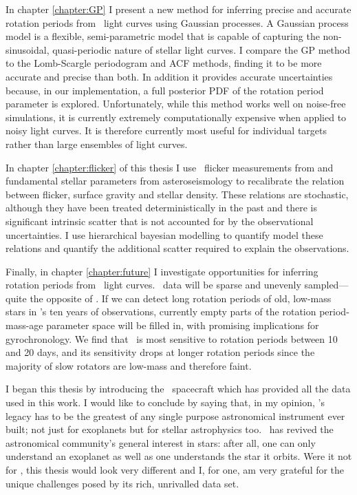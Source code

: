 In chapter \ref{chapter:GP} I present a new method for inferring precise and
accurate rotation periods from \kepler\ light curves using Gaussian processes.
A Gaussian process model is a flexible, semi-parametric model that is capable
of capturing the non-sinusoidal, quasi-periodic nature of stellar light
curves.
I compare the GP method to the Lomb-Scargle periodogram and ACF methods,
finding it to be more accurate and precise than both.
In addition it provides accurate uncertainties because, in our implementation,
a full posterior PDF of the rotation period parameter is explored.
Unfortunately, while this method works well on noise-free simulations, it is
currently extremely computationally expensive when applied to noisy light
curves.
It is therefore currently most useful for individual targets rather than large
ensembles of light curves.

In chapter \ref{chapter:flicker} of this thesis I use \kepler\ flicker
measurements from \citet{Bastien2013} and fundamental stellar parameters from
asteroseismology to recalibrate the relation between flicker, surface gravity
and stellar density.
These relations are stochastic, although they have been treated
deterministically in the past \citep[\eg][]{Bastien2013, Kipping2014} and
there is significant intrinsic scatter that is not accounted for by the
observational uncertainties.
I use hierarchical bayesian modelling to quantify  model these relations and
quantify the additional scatter required to explain the observations.

Finally, in chapter \ref{chapter:future} I investigate opportunities for
inferring rotation periods from \LSST\ light curves.
\LSST\ data will be sparse and unevenly sampled---quite the opposite of
\kepler.
If we can detect long rotation periods of old, low-mass stars in \LSST's ten
years of observations, currently empty parts of the rotation period-mass-age
parameter space will be filled in, with promising implications for
gyrochronology.
We find that \LSST\ is most sensitive to rotation periods between 10 and 20
days, and its sensitivity drops at longer rotation periods since the majority
of slow rotators are low-mass and therefore faint.

I began this thesis by introducing the \kepler\ spacecraft which has provided
all the data used in this work.
I would like to conclude by saying that, in my opinion, \kepler's legacy has
to be the greatest of any single purpose astronomical instrument ever built;
not just for exoplanets but for stellar astrophysics too.
\kepler\ has revived the astronomical community's general interest in stars:
after all, one can only understand an exoplanet as well as one understands the
star it orbits.
Were it not for \kepler, this thesis would look very different and I, for one,
am very grateful for the unique challenges posed by its rich, unrivalled data
set.
